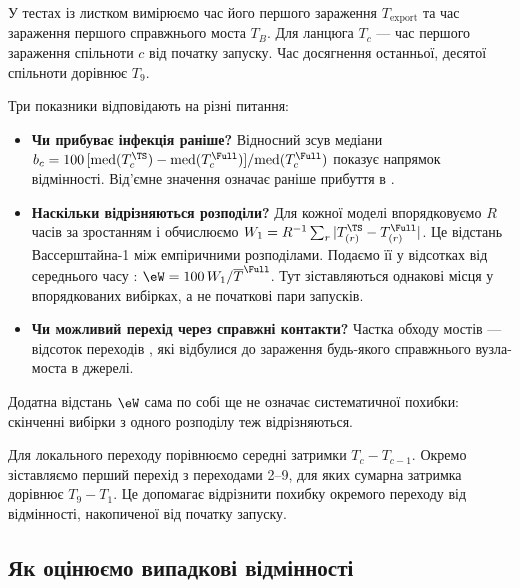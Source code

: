 У тестах із листком вимірюємо час його першого зараження $T_{\mathrm{export}}$ та час зараження першого справжнього моста $T_B$. Для ланцюга $T_c$ --- час першого зараження спільноти $c$ від початку запуску. Час досягнення останньої, десятої спільноти дорівнює $T_9$.
\par Три показники відповідають на різні питання:
\begin{itemize}
\item \textbf{Чи прибуває інфекція раніше?} Відносний зсув медіани $b_c=100\,[\mathrm{med}(T^{\TS}_c)-\mathrm{med}(T^{\Full}_c)]/\mathrm{med}(T^{\Full}_c)$ показує напрямок відмінності. Від'ємне значення означає раніше прибуття в \TS{}.
\item \textbf{Наскільки відрізняються розподіли?} Для кожної моделі впорядковуємо $R$ часів за зростанням і обчислюємо $W_1=R^{-1}\sum_r|T^{\TS}_{(r)}-T^{\Full}_{(r)}|$. Це відстань Вассерштайна-1 між емпіричними розподілами. Подаємо її у відсотках від середнього часу \Full{}: $\eW=100\,W_1/\overline{T}^{\Full}$. Тут зіставляються однакові місця у впорядкованих вибірках, а не початкові пари запусків.
\item \textbf{Чи можливий перехід через справжні контакти?} Частка обходу мостів --- відсоток переходів \TS{}, які відбулися до зараження будь-якого справжнього вузла-моста в джерелі.
\end{itemize}
Додатна відстань $\eW$ сама по собі ще не означає систематичної похибки: скінченні вибірки з одного розподілу теж відрізняються.
\par Для локального переходу порівнюємо середні затримки $T_c-T_{c-1}$. Окремо зіставляємо перший перехід з переходами 2--9, для яких сумарна затримка дорівнює $T_9-T_1$. Це допомагає відрізнити похибку окремого переходу від відмінності, накопиченої від початку запуску.

\subsection{Як оцінюємо випадкові відмінності}

